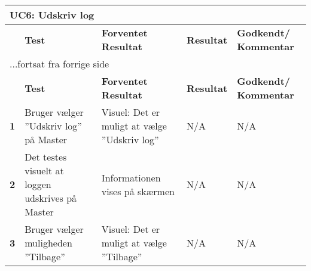 
\begin{center}
\begin{longtable}{|p{}|p{}|p{}|p{}|p{}|} %
\hline
\multicolumn{5}{|l|}{\textbf{UC6: Udskriv log}} \\ \hline
\multicolumn{1}{|c|}{} &
\textbf{Test} &
\textbf{Forventet \newline Resultat} &
\textbf{Resultat} &
\textbf{Godkendt/ \newline Kommentar} \\ \hline 
\endfirsthead

\multicolumn{5}{l}{...fortsat fra forrige side} \\ \hline 
\multicolumn{1}{|c|}{} &
\textbf{Test} &
\textbf{Forventet \newline Resultat} &
\textbf{Resultat} &
\textbf{Godkendt/ \newline Kommentar} \\ \hline 
\endhead

\textbf{1}	&Bruger vælger ''Udskriv log'' på Master
			&Visuel: Det er muligt at vælge ''Udskriv log''
			&N/A
			&N/A \\ \hline 
			
\textbf{2}	&Det testes visuelt at loggen udskrives på Master
			&Informationen vises på skærmen
			&N/A
			&N/A \\ \hline 
			
\textbf{3}	&Bruger vælger muligheden ''Tilbage''
			&Visuel: Det er muligt at vælge ''Tilbage''
			&N/A
			&N/A \\ \hline 
			
\end{longtable}
	\label{ATUC8} 
\end{center}
